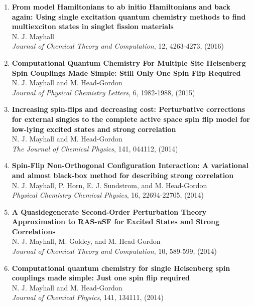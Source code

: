 \documentclass[11pt]{article}
\begin{document}
\begin{enumerate}
\item \textbf{From model Hamiltonians to ab initio Hamiltonians and back again: Using single excitation quantum chemistry methods to find multiexciton states in singlet fission materials}\\
N. J. Mayhall\\
\textsl{Journal of Chemical Theory and Computation}, 12, 4263-4273, (2016)

\item \textbf{Computational Quantum Chemistry For Multiple Site Heisenberg Spin Couplings Made Simple: Still Only One Spin Flip Required}\\
N. J. Mayhall and M. Head-Gordon\\
\textsl{Journal of Physical Chemistry Letters}, 6, 1982-1988, (2015)

\item \textbf{Increasing spin-flips and decreasing cost: Perturbative corrections for external singles to the complete 
		active space spin flip model for low-lying excited states and strong correlation}\\
N. J. Mayhall and M. Head-Gordon\\
\textsl{The Journal of Chemical Physics}, 141, 044112, (2014)

\item \textbf{Spin-Flip Non-Orthogonal Configuration Interaction: A variational and almost black-box method for describing strong correlation}\\
N. J. Mayhall, P. Horn, E. J. Sundstrom, and M. Head-Gordon\\
\textsl{Physical Chemistry Chemical Physics}, 16, 22694-22705, (2014)


\item \textbf{A Quasidegenerate Second-Order Perturbation Theory Approximation to RAS-\textsl{n}SF for Excited States and Strong Correlations}\\
N. J. Mayhall, M. Goldey, and M. Head-Gordon\\
\textsl{Journal of Chemical Theory and Computation}, 10, 589-599, (2014)


\item \textbf{Computational quantum chemistry for single Heisenberg spin couplings made simple: Just one spin flip required}\\
N. J. Mayhall and M. Head-Gordon\\
\textsl{Journal of Chemical Physics}, 141, 134111, (2014)



\end{enumerate}
\end{document}
